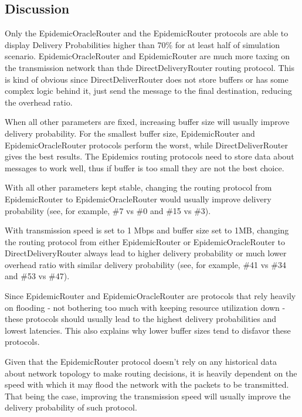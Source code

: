 \newpage

\subsection{Discussion}

Only the EpidemicOracleRouter and the EpidemicRouter protocols are able to
display Delivery Probabilities higher than 70\% for at least half of simulation
scenario. EpidemicOracleRouter and EpidemicRouter are much more taxing on the
transmission network than thde DirectDeliveryRouter routing protocol. This is
kind of obvious since DirectDeliverRouter does not store buffers or has some
complex logic behind it, just send the message to the final destination,
reducing the overhead ratio.

When all other parameters are fixed, increasing buffer size will usually
improve delivery probability. For the smallest buffer size, EpidemicRouter and
EpidemicOracleRouter protocols perform the worst, while DirectDeliverRouter
gives the best results.  The Epidemics routing protocols need to store data
about messages to work well, thus if buffer is too small they are not the best
choice.

With all other parameters kept stable, changing the routing protocol from
EpidemicRouter to EpidemicOracleRouter would usually improve delivery
probability (see, for example, \#7 vs \#0 and \#15 vs \#3).

With transmission speed is set to 1 Mbps and buffer size set to 1MB,
changing the routing protocol from either EpidemicRouter or
EpidemicOracleRouter to DirectDeliveryRouter always lead to higher delivery
probability or much lower overhead ratio with similar delivery probability
(see, for example, \#41 vs \#34 and \#53 vs \#47).

Since EpidemicRouter and EpidemicOracleRouter are protocols that rely heavily
on flooding - not bothering too much with keeping resource utilization down -
these protocols should usually lead to the highest delivery probabilities and
lowest latencies. This also explains why lower
buffer sizes tend to disfavor these protocols.

Given that the EpidemicRouter protocol doesn't rely on any historical data
about network topology to make routing decisions, it is heavily dependent on
the speed with which it may flood the network with the packets to be
transmitted. That being the case, improving the transmission speed will usually
improve the delivery probability of such protocol.

